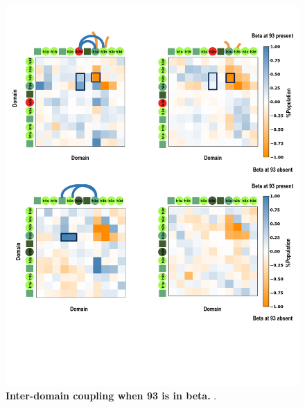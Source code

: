 \documentclass[journal=jacsat,manuscript=article]{achemso}
\begin{document}
\begin{figure}[!ht]
 \includegraphics[scale=0.5,width=\textwidth,trim={0 0cm 0 0},clip]{../figures/S10.pdf}
\caption{{\bf Inter-domain coupling when 93 is in beta.}
.
 }
\label{S10} 
\end{figure}
\end{document}
